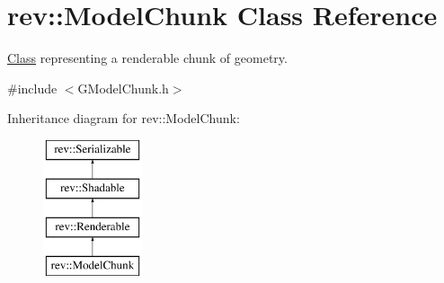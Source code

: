 \hypertarget{classrev_1_1_model_chunk}{}\section{rev\+::Model\+Chunk Class Reference}
\label{classrev_1_1_model_chunk}


\mbox{\hyperlink{struct_class}{Class}} representing a renderable chunk of geometry.  




{\ttfamily \#include $<$G\+Model\+Chunk.\+h$>$}

Inheritance diagram for rev\+::Model\+Chunk\+:\begin{figure}[H]
\begin{center}
\leavevmode
\includegraphics[height=4.000000cm]{classrev_1_1_model_chunk}
\end{center}
\end{figure}
